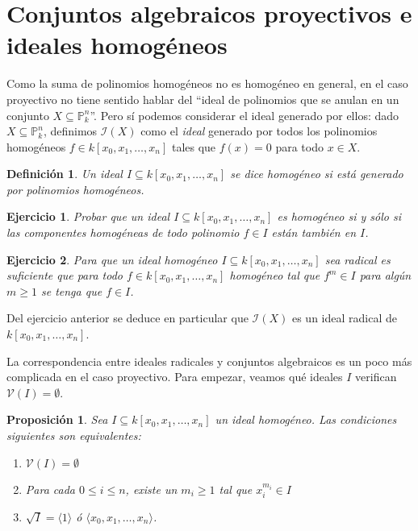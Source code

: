 \documentclass[a4paper,10pt]{book}
\newtheorem{prop}[thm]{Proposición}
\newtheorem{defn}[thm]{Definición}
\newtheorem{ejercicio}{Ejercicio}[chapter]
\newcommand{\PP}{\mathbb P}
\newcommand{\Pnk}{\PP^n_k}
\newcommand{\II}{{\mathcal I}}
\newcommand{\VV}{{\mathcal V}}
\begin{document}
\section{Conjuntos algebraicos proyectivos e ideales homogéneos}

Como la suma de polinomios homogéneos no es homogéneo en general, en el caso proyectivo no tiene sentido hablar del ``ideal de polinomios que se anulan en un conjunto $X\subseteq\Pnk$''. Pero sí podemos considerar el ideal generado por ellos: dado $X\subseteq\Pnk$, definimos $\II(X)$ como el \emph{ideal} generado por todos los polinomios homogéneos $f\in k[x_0,x_1,\ldots,x_n]$ tales que $f(x)=0$ para todo $x\in X$. 

\begin{defn}
 Un ideal $I\subseteq k[x_0,x_1,\ldots,x_n]$ se dice \emph{homogéneo} si está generado por polinomios homogéneos.
\end{defn}

\begin{ejercicio}
 Probar que un ideal $I\subseteq k[x_0,x_1,\ldots,x_n]$ es homogéneo si y sólo si las componentes homogéneas de todo polinomio $f\in I$ están también en $I$.
\end{ejercicio}

\begin{ejercicio}
 Para que un ideal homogéneo $I\subseteq k[x_0,x_1,\ldots,x_n]$ sea radical es suficiente que para todo $f\in k[x_0,x_1,\ldots,x_n]$ \emph{homogéneo} tal que $f^m\in I$ para algún $m\geq 1$ se tenga que $f\in I$. 
\end{ejercicio}

Del ejercicio anterior se deduce en particular que $\II(X)$ es un ideal radical de $k[x_0,x_1,\ldots,x_n]$.

 La correspondencia entre ideales radicales y conjuntos algebraicos es un poco más complicada en el caso proyectivo. Para empezar, veamos qué ideales $I$ verifican $\VV(I)=\emptyset$.

\begin{prop}\label{idealirrelevante} Sea $I\subseteq k[x_0,x_1,\ldots,x_n]$ un ideal homogéneo. Las condiciones siguientes son equivalentes:
 \begin{enumerate}
  \item $\VV(I)=\emptyset$
\item Para cada $0\leq i\leq n$, existe un $m_i\geq 1$ tal que $x_i^{m_i}\in I$
\item $\sqrt{I}=\langle 1\rangle$ ó $\langle x_0,x_1,\ldots,x_n\rangle$.
 \end{enumerate}

\end{prop}
\end{document}
